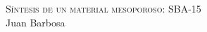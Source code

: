 \documentclass[handout]{beamer}
\begin{document}
{
	\begin{frame}
	
		\centering
		\textsc{\LARGE S\'intesis de un material mesoporoso: SBA-15}
		\\
		\vspace{5cm}
		Juan Barbosa
	\end{frame}
}
\end{document}
